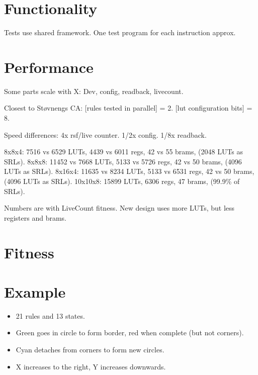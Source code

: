 \TODO

\section{Functionality}

\TODO
Tests use shared framework.
One test program for each instruction approx.

\section{Performance}

\TODO

Some parts scale with X: Dev, config, readback, livecount.

Closest to Støvnengs CA:
[rules tested in parallel] = 2.
[lut configuration bits] = 8.

Speed differences:
4x rsf/live counter.
1/2x config.
1/8x readback.

8x8x4: 7516 vs 6529 LUTs, 4439 vs 6011 regs, 42 vs 55 brams, (2048 LUTs as SRLs).
8x8x8: 11452 vs 7668 LUTs, 5133 vs 5726 regs, 42 vs 50 brams, (4096 LUTs as SRLs).
8x16x4: 11635 vs 8234 LUTs, 5133 vs 6531 regs, 42 vs 50 brams, (4096 LUTs as SRLs).
10x10x8: 15899 LUTs, 6306 regs, 47 brams, (99.9\% of SRLs).

Numbers are with LiveCount fitness.
New design uses more LUTs, but less registers and brams.


\section{Fitness}

\TODO

\section{Example}


\begin{itemize}
    \item 21 rules and 13 states.
    \item Green goes in circle to form border, red when complete (but not corners).
    \item Cyan detaches from corners to form new circles.
    \item X increases to the right, Y increases downwards.
\end{itemize}


